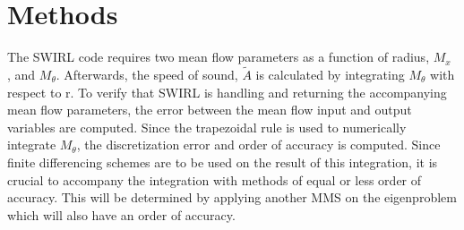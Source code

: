 \section{Methods}
%
%
The SWIRL code requires two mean flow parameters as a function of radius, $M_x$
, and $M_{\theta}$. Afterwards, the speed of sound, $\widetilde{A}$ is calculated by 
integrating $M_{\theta}$ with respect to r. To verify that SWIRL is handling 
and returning the accompanying mean flow parameters, the error between the 
mean flow input and output variables are computed. Since the trapezoidal rule
is used to numerically integrate $M_{\theta}$, the discretization error and 
order of accuracy is computed. Since finite differencing schemes are to be used 
on the result of this integration, it is crucial to accompany the integration 
with methods of equal or less order of accuracy. This will be determined by 
applying another MMS on the eigenproblem which will also have an order of 
accuracy.

